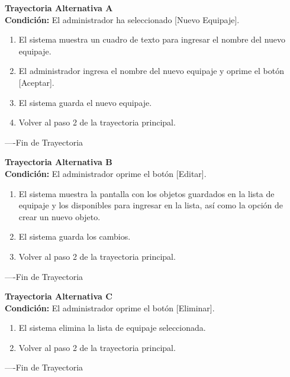 \begin{flushleft}
	\hypertarget{TrayectoriaA_CU-A-02}{}
	\textbf{Trayectoria Alternativa A}\\
	\textbf{Condición:} El administrador ha seleccionado [Nuevo Equipaje]. \\
	\begin{enumerate}
		\item El sistema muestra un cuadro de texto para ingresar el nombre del nuevo equipaje. 
		\item El administrador ingresa el nombre del nuevo equipaje y oprime el botón [Aceptar].
		\item El sistema guarda el nuevo equipaje.
		\item Volver al paso 2 de la trayectoria principal.
	\end{enumerate}
\end{flushleft}
----Fin de Trayectoria

\begin{flushleft}
	\hypertarget{TrayectoriaB_CU-A-02}{}
	\textbf{Trayectoria Alternativa B}\\
	\textbf{Condición:} El administrador oprime el botón [Editar]. \\
	\begin{enumerate}
		\item El sistema muestra la pantalla con los objetos guardados en la lista de equipaje y los disponibles para ingresar en la lista, así como la opción de crear un nuevo objeto. 
		\item El sistema guarda los cambios.
		\item Volver al paso 2 de la trayectoria principal.
	\end{enumerate}
\end{flushleft}
----Fin de Trayectoria

\begin{flushleft}
	\hypertarget{TrayectoriaC_CU-A-02}{}
	\textbf{Trayectoria Alternativa C}\\
	\textbf{Condición:} El administrador oprime el botón [Eliminar]. \\
	\begin{enumerate}
		\item El sistema elimina la lista de equipaje seleccionada.
		\item Volver al paso 2 de la trayectoria principal.
	\end{enumerate}
\end{flushleft}
----Fin de Trayectoria
\clearpage

